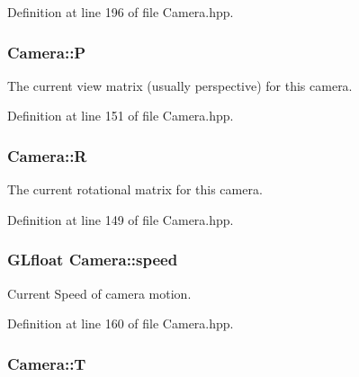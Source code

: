 \-Definition at line 196 of file \-Camera.\-hpp.

\hypertarget{class_camera_a0bee6fbae6ec5960850a5fb858f3912a}{
\subsubsection[{\-P}]{ {\bf \-Camera\-::\-P}}}\label{class_camera_a0bee6fbae6ec5960850a5fb858f3912a}


\-The current view matrix (usually perspective) for this camera. 



\-Definition at line 151 of file \-Camera.\-hpp.

\hypertarget{class_camera_a8fd028120b18556c43ad86756e637fbc}{
\subsubsection[{\-R}]{ {\bf \-Camera\-::\-R}}}\label{class_camera_a8fd028120b18556c43ad86756e637fbc}


\-The current rotational matrix for this camera. 



\-Definition at line 149 of file \-Camera.\-hpp.

\hypertarget{class_camera_a308e92b5d3ef0eea5cac7745df6e28f4}{
\subsubsection[{speed}]{\setlength{\rightskip}{0pt plus 5cm}\-G\-Lfloat {\bf \-Camera\-::speed}}}\label{class_camera_a308e92b5d3ef0eea5cac7745df6e28f4}


\-Current \-Speed of camera motion. 



\-Definition at line 160 of file \-Camera.\-hpp.

\hypertarget{class_camera_aa4cb92b539c9a9707a12d7025ed889f6}{
\subsubsection[{\-T}]{ {\bf \-Camera\-::\-T}}}\label{class_camera_aa4cb92b539c9a9707a12d7025ed889f6}


